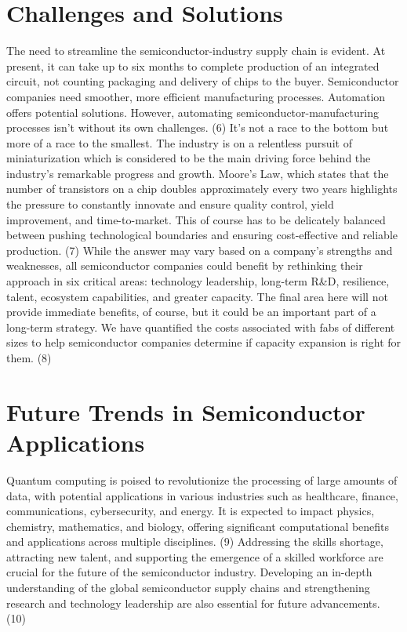 \documentclass[12pt]{article}
\begin{document}
	\section{Challenges and Solutions}
	The need to streamline the semiconductor-industry supply chain is evident. At present, it can take up to six months to complete production of an integrated circuit, not counting packaging and delivery of chips to the buyer. Semiconductor companies need smoother, more efficient manufacturing processes. Automation offers potential solutions. However, automating semiconductor-manufacturing processes isn’t without its own challenges. (6) It’s not a race to the bottom but more of a race to the smallest. The industry is on a relentless pursuit of miniaturization which is considered to be the main driving force behind the industry’s remarkable progress and growth. Moore’s Law, which states that the number of transistors on a chip doubles approximately every two years highlights the pressure to constantly innovate and ensure quality control, yield improvement, and time-to-market. This of course has to be delicately balanced between pushing technological boundaries and ensuring cost-effective and reliable production. (7) While the answer may vary based on a company’s strengths and weaknesses, all semiconductor companies could benefit by rethinking their approach in six critical areas: technology leadership, long-term R\&D, resilience, talent, ecosystem capabilities, and greater capacity. The final area here will not provide immediate benefits, of course, but it could be an important part of a long-term strategy. We have quantified the costs associated with fabs of different sizes to help semiconductor companies determine if capacity expansion is right for them. (8)
	
	\section{Future Trends in Semiconductor Applications}
	Quantum computing is poised to revolutionize the processing of large amounts of data, with potential applications in various industries such as healthcare, finance, communications, cybersecurity, and energy. It is expected to impact physics, chemistry, mathematics, and biology, offering significant computational benefits and applications across multiple disciplines. (9) Addressing the skills shortage, attracting new talent, and supporting the emergence of a skilled workforce are crucial for the future of the semiconductor industry. Developing an in-depth understanding of the global semiconductor supply chains and strengthening research and technology leadership are also essential for future advancements. (10)
	
\end{document}

